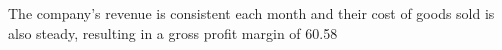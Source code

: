 

The company's revenue is consistent each month and their cost of goods sold is also steady, resulting in a gross profit margin of 60.58%